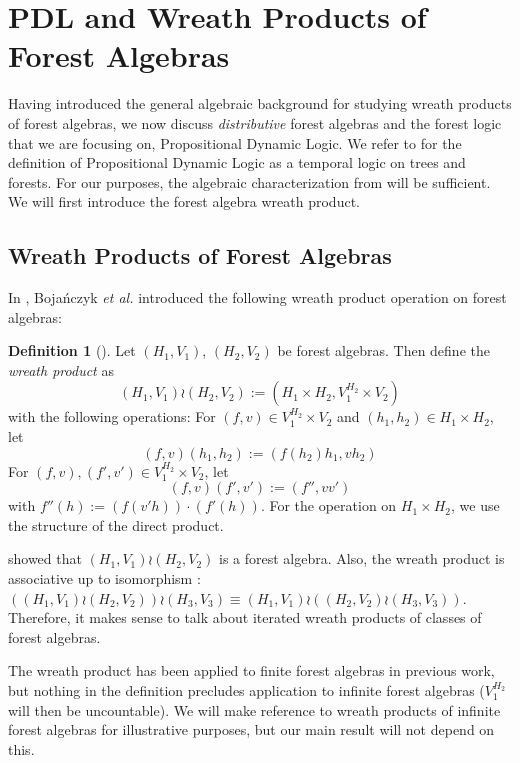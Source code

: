 \documentclass[sigplan,9pt]{acmart}\settopmatter{printfolios=true,printccs=false,printacmref=false}
\newcounter{thm}
\newcounter{theorem}
\theoremstyle{definition}
\newtheorem{defin}[thm]{Definition}
\begin{document}
\section{PDL and Wreath Products of Forest Algebras}\label{sec:wreath-pdl}

Having introduced the general algebraic background for studying wreath products of forest algebras,
we now discuss \emph{distributive} forest algebras and the forest logic that we are focusing on, Propositional Dynamic Logic. 
We refer to \cite{bojanczyk-wreath-2012} for the definition of Propositional Dynamic Logic as a temporal logic on trees and forests.
For our purposes, the algebraic characterization from \cite{bojanczyk-wreath-2012} will be sufficient.
We will first introduce the forest algebra wreath product.


\subsection{Wreath Products of Forest Algebras}
In \cite{bojanczyk-wreath-2012}, Boja{\'n}czyk \textit{et al.} introduced the following wreath product operation on forest algebras: 

\begin{defin}[\cite{bojanczyk-wreath-2012}]
Let $(H_1,V_1)$, $(H_2,V_2)$ be forest algebras.
Then define the \emph{wreath product} as
$$(H_1,V_1) \wr (H_2,V_2) := (H_1 \times H_2, V_1^{H_2} \times V_2)$$
with the following operations: For $(f,v) \in V_1^{H_2} \times V_2$ and $(h_1, h_2) \in H_1 \times H_2$, let $$(f,v)  (h_1, h_2) := (f(h_2)h_1, vh_2)$$
For $(f,v), (f',v') \in V_1^{H_2} \times V_2$, let $$(f,v)(f',v') := (f'', vv')$$ with $f''(h) := (f(v'h)) \cdot (f'(h))$. For the operation on $H_1\times H_2$, we use the structure of the direct product.
\end{defin}

\cite{bojanczyk-wreath-2012} showed that $(H_1, V_1) \wr (H_2,V_2)$ is a forest algebra.
Also, the wreath product is associative up to isomorphism \cite{bojanczyk-wreath-2012}: $((H_1, V_1) \wr (H_2, V_2)) \wr (H_3, V_3) \equiv(H_1, V_1) \wr ((H_2, V_2) \wr (H_3, V_3))$.
Therefore, it makes sense to talk about iterated wreath products of classes of forest algebras.

The wreath product has been applied to finite forest algebras in previous work, but nothing in the definition precludes application to infinite forest algebras ($V_1^{H_2}$ will then be uncountable).
We will make reference to wreath products of infinite forest algebras for illustrative purposes, but our main result will not depend on this.
\end{document}
